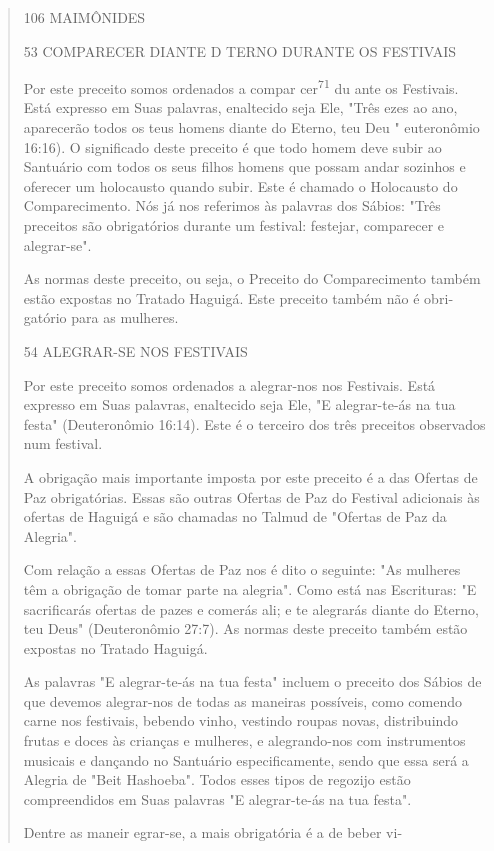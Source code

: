 \begin{quote}
106 MAIMÔNIDES

53 COMPARECER DIANTE D TERNO DURANTE OS FESTIVAIS

Por este preceito somos ordenados a compar cer\textsuperscript{71} du
ante os Fes­tivais. Está expresso em Suas palavras, enaltecido seja Ele,
"Três ezes ao ano, aparecerão todos os teus homens diante do Eterno, teu
Deu " euteronômio 16:16). O significado deste preceito é que todo homem
deve subir ao Santuá­rio com todos os seus filhos homens que possam
andar sozinhos e oferecer um holocausto quando subir. Este é chamado o
Holocausto do Comparecimento. Nós já nos referimos às palavras dos
Sábios: "Três preceitos são obrigatórios durante um festival: festejar,
comparecer e alegrar-se".

As normas deste preceito, ou seja, o Preceito do Comparecimento também
estão expostas no Tratado Haguigá. Este preceito também não é
obri­gatório para as mulheres.

54 ALEGRAR-SE NOS FESTIVAIS

Por este preceito somos ordenados a alegrar-nos nos Festivais. Está
expresso em Suas palavras, enaltecido seja Ele, "E alegrar-te-ás na tua
festa" (Deuteronômio 16:14). Este é o terceiro dos três preceitos
observados num festival.

A obrigação mais importante imposta por este preceito é a das Ofer­tas
de Paz obrigatórias. Essas são outras Ofertas de Paz do Festival
adicionais às ofertas de Haguigá e são chamadas no Talmud de "Ofertas de
Paz da Alegria".

Com relação a essas Ofertas de Paz nos é dito o seguinte: "As mulhe­res
têm a obrigação de tomar parte na alegria". Como está nas Escrituras: "E
sacrificarás ofertas de pazes e comerás ali; e te alegrarás diante do
Eterno, teu Deus" (Deuteronômio 27:7). As normas deste preceito também
estão expostas no Tratado Haguigá.

As palavras "E alegrar-te-ás na tua festa" incluem o preceito dos
Sá­bios de que devemos alegrar-nos de todas as maneiras possíveis, como
comen­do carne nos festivais, bebendo vinho, vestindo roupas novas,
distribuindo frutas e doces às crianças e mulheres, e alegrando-nos com
instrumentos musicais e dançando no Santuário especificamente, sendo que
essa será a Alegria de "Beit Hashoeba". Todos esses tipos de regozijo
estão compreendidos em Suas pala­vras "E alegrar-te-ás na tua festa".

Dentre as maneir egrar-se, a mais obrigatória é a de beber vi-


\end{quote}
